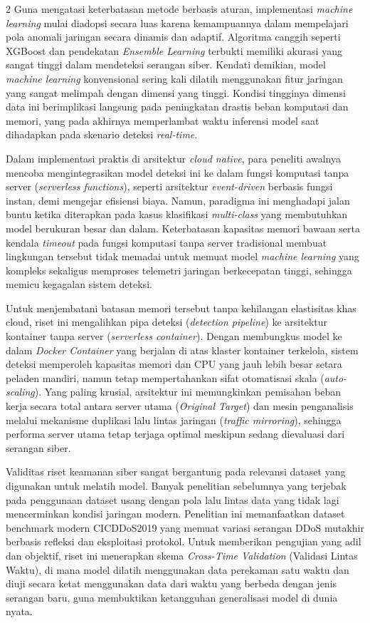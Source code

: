 \documentclass[10pt,a4paper]{article}
\begin{document}
\begin{multicols}{2}
Guna mengatasi keterbatasan metode berbasis aturan, implementasi \textit{machine learning} mulai diadopsi secara luas karena kemampuannya dalam mempelajari pola anomali jaringan secara dinamis dan adaptif. Algoritma canggih seperti XGBoost dan pendekatan \textit{Ensemble Learning} terbukti memiliki akurasi yang sangat tinggi dalam mendeteksi serangan siber. Kendati demikian, model \textit{machine learning} konvensional sering kali dilatih menggunakan fitur jaringan yang sangat melimpah dengan dimensi yang tinggi. Kondisi tingginya dimensi data ini berimplikasi langsung pada peningkatan drastis beban komputasi dan memori, yang pada akhirnya memperlambat waktu inferensi model saat dihadapkan pada skenario deteksi \textit{real-time}.

Dalam implementasi praktis di arsitektur \textit{cloud native}, para peneliti awalnya mencoba mengintegrasikan model deteksi ini ke dalam fungsi komputasi tanpa server (\textit{serverless functions}), seperti arsitektur \textit{event-driven} berbasis fungsi instan, demi mengejar efisiensi biaya. Namun, paradigma ini menghadapi jalan buntu ketika diterapkan pada kasus klasifikasi \textit{multi-class} yang membutuhkan model berukuran besar dan dalam. Keterbatasan kapasitas memori bawaan serta kendala \textit{timeout} pada fungsi komputasi tanpa server tradisional membuat lingkungan tersebut tidak memadai untuk memuat model \textit{machine learning} yang kompleks sekaligus memproses telemetri jaringan berkecepatan tinggi, sehingga memicu kegagalan sistem deteksi.

Untuk menjembatani batasan memori tersebut tanpa kehilangan elastisitas khas cloud, riset ini mengalihkan pipa deteksi (\textit{detection pipeline}) ke arsitektur kontainer tanpa server (\textit{serverless container}). Dengan membungkus model ke dalam \textit{Docker Container} yang berjalan di atas klaster kontainer terkelola, sistem deteksi memperoleh kapasitas memori dan CPU yang jauh lebih besar setara peladen mandiri, namun tetap mempertahankan sifat otomatisasi skala (\textit{auto-scaling}). Yang paling krusial, arsitektur ini memungkinkan pemisahan beban kerja secara total antara server utama (\textit{Original Target}) dan mesin penganalisis melalui mekanisme duplikasi lalu lintas jaringan (\textit{traffic mirroring}), sehingga performa server utama tetap terjaga optimal meskipun sedang dievaluasi dari serangan siber.

Validitas riset keamanan siber sangat bergantung pada relevansi dataset yang digunakan untuk melatih model. Banyak penelitian sebelumnya yang terjebak pada penggunaan dataset usang dengan pola lalu lintas data yang tidak lagi mencerminkan kondisi jaringan modern. Penelitian ini memanfaatkan dataset benchmark modern CICDDoS2019 yang memuat variasi serangan DDoS mutakhir berbasis refleksi dan eksploitasi protokol. Untuk memberikan pengujian yang adil dan objektif, riset ini menerapkan skema \textit{Cross-Time Validation} (Validasi Lintas Waktu), di mana model dilatih menggunakan data perekaman satu waktu dan diuji secara ketat menggunakan data dari waktu yang berbeda dengan jenis serangan baru, guna membuktikan ketangguhan generalisasi model di dunia nyata.


\end{multicols}
\end{document}
